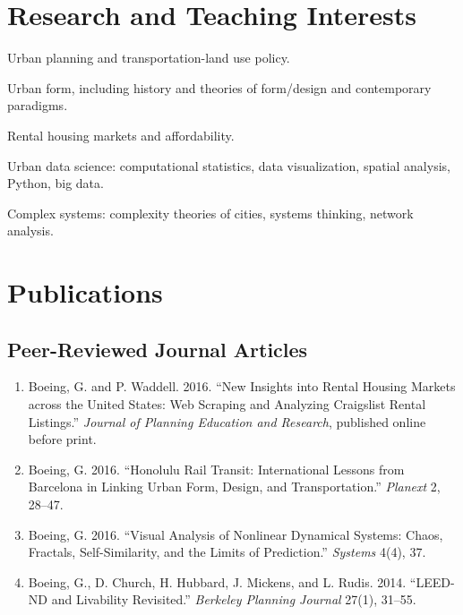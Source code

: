\documentclass[11pt,letterpaper]{report}
\renewenvironment{itemize}{
  \begin{list}{}{
      \setlength{\leftmargin}{1.75em}
      \setlength{\itemsep}{0.25em}
      \setlength{\parskip}{0em}
      \setlength{\parsep}{0.25em}
    }
}{
  \end{list}
}
\begin{document}
\section*{Research and Teaching Interests}

\begin{itemize}
\item Urban planning and transportation-land use policy.
\item Urban form, including history and theories of form/design and contemporary paradigms.
\item Rental housing markets and affordability.
\item Urban data science: computational statistics, data visualization, spatial analysis, Python, big data.
\item Complex systems: complexity theories of cities, systems thinking, network analysis.
\end{itemize}



\section*{Publications}

\subsection*{Peer-Reviewed Journal Articles}

\begin{enumerate}

\item Boeing, G. and P. Waddell. 2016. \enquote{New Insights into Rental Housing Markets across the United States: Web Scraping and Analyzing Craigslist Rental Listings.} \emph{Journal of Planning Education and Research}, published online before print.

\item Boeing, G. 2016. \enquote{Honolulu Rail Transit: International Lessons from Barcelona in Linking Urban Form, Design, and Transportation.} \emph{Planext} 2, 28--47.

\item Boeing, G. 2016. \enquote{Visual Analysis of Nonlinear Dynamical Systems: Chaos, Fractals, Self-Similarity, and the Limits of Prediction.} \emph{Systems} 4(4), 37.

\item Boeing, G., D. Church, H. Hubbard, J. Mickens, and L. Rudis. 2014. \enquote{LEED-ND and Livability Revisited.} \emph{Berkeley Planning Journal} 27(1), 31--55.

\end{enumerate}
\end{document}
